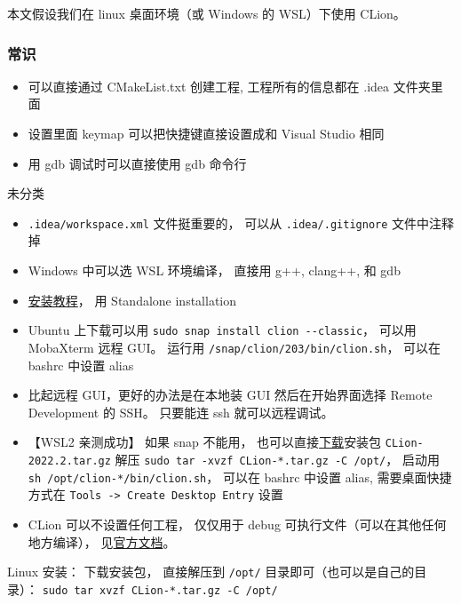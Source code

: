 
\begin{issues}
\issueDraft
\end{issues}

本文假设我们在 linux 桌面环境（或 Windows 的 WSL）下使用 CLion。

\subsubsection{常识}
\begin{itemize}
\item 可以直接通过 CMakeList.txt 创建工程, 工程所有的信息都在 .idea 文件夹里面
\item 设置里面 keymap 可以把快捷键直接设置成和 Visual Studio 相同
\item 用 gdb 调试时可以直接使用 gdb 命令行
\end{itemize}


未分类
\begin{itemize}
\item \verb`.idea/workspace.xml` 文件挺重要的， 可以从 \verb`.idea/.gitignore` 文件中注释掉
\item Windows 中可以选 WSL 环境编译， 直接用 g++, clang++, 和 gdb
\item \href{https://www.jetbrains.com/help/clion/installation-guide.html}{安装教程}， 用 Standalone installation
\item Ubuntu 上下载可以用 \verb`sudo snap install clion --classic`， 可以用 MobaXterm 远程 GUI。 运行用 \verb`/snap/clion/203/bin/clion.sh`， 可以在 bashrc 中设置 alias
\item 比起远程 GUI，更好的办法是在本地装 GUI 然后在开始界面选择 Remote Development 的 SSH。 只要能连 ssh 就可以远程调试。
\item 【WSL2 亲测成功】 如果 snap 不能用， 也可以直接\href{https://www.jetbrains.com/clion/download/#section=linux}{下载}安装包 \verb`CLion-2022.2.tar.gz` 解压 \verb`sudo tar -xvzf CLion-*.tar.gz -C /opt/`， 启动用 \verb`sh /opt/clion-*/bin/clion.sh`， 可以在 bashrc 中设置 alias, 需要桌面快捷方式在 \verb`Tools -> Create Desktop Entry` 设置

\item CLion 可以不设置任何工程， 仅仅用于 debug 可执行文件（可以在其他任何地方编译）， 见\href{https://www.jetbrains.com/help/clion/debug-arbitrary-executable.html}{官方文档}。
\end{itemize}

Linux 安装： 下载安装包， 直接解压到 \verb|/opt/| 目录即可（也可以是自己的目录）： \verb|sudo tar xvzf CLion-*.tar.gz -C /opt/|

